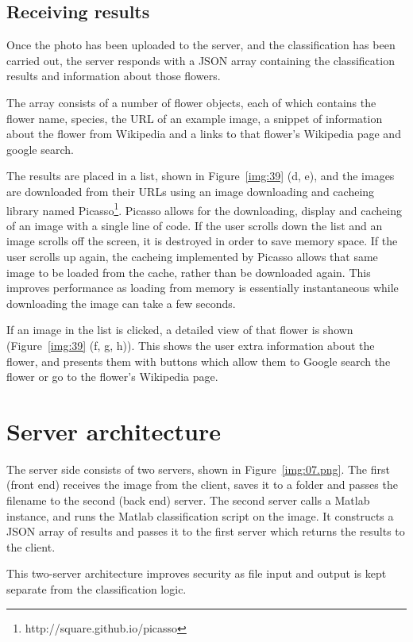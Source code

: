 \documentclass[11pt, a4paper]{report}
\begin{document}
\subsection{Receiving results}

Once the photo has been uploaded to the server, and the classification has been carried out, the server responds with a JSON array containing the classification results and information about those flowers. 

The array consists of a number of flower objects, each of which contains the flower name, species, the URL of an example image, a snippet of information about the flower from Wikipedia and a links to that flower's Wikipedia page and google search.

The results are placed in a list, shown in Figure~\ref{img:39} (d, e), and the images are downloaded from their URLs using an image downloading and cacheing library named Picasso\footnote{http://square.github.io/picasso}. Picasso allows for the downloading, display and cacheing of an image with a single line of code. If the user scrolls down the list and an image scrolls off the screen, it is destroyed in order to save memory space. If the user scrolls up again, the cacheing implemented by Picasso allows that same image to be loaded from the cache, rather than be downloaded again. This improves performance as loading from memory is essentially instantaneous while downloading the image can take a few seconds.

If an image in the list is clicked, a detailed view of that flower is shown (Figure~\ref{img:39} (f, g, h)). This shows the user extra information about the flower, and presents them with buttons which allow them to Google search the flower or go to the flower's Wikipedia page. 



\section{Server architecture}


The server side consists of two servers, shown in Figure~\ref{img:07.png}. The first (front end) receives the image from the client, saves it to a folder and passes the filename to the second (back end) server. The second server calls a Matlab instance, and runs the Matlab classification script on the image. It constructs a JSON array of results and passes it to the first server which returns the results to the client. 

This two-server architecture improves security as file input and output is kept separate from the classification logic.
\end{document}
